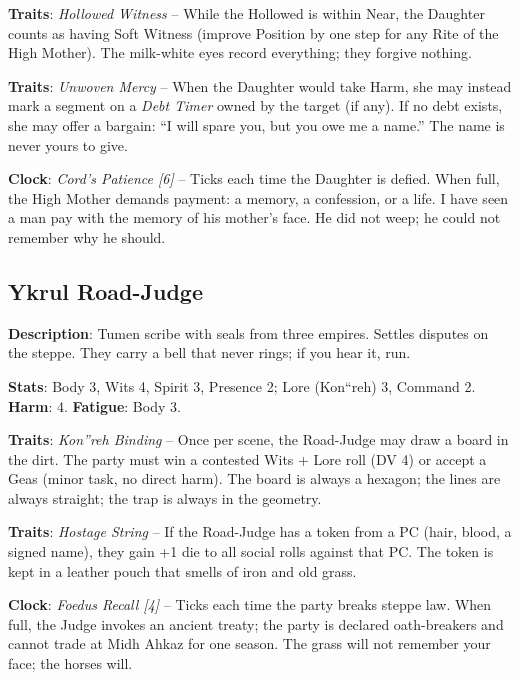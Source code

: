 \noindent\textbf{Traits}: \emph{Hollowed Witness} -- While the Hollowed is within Near, the Daughter counts as having Soft Witness (improve Position by one step for any Rite of the High Mother). The milk-white eyes record everything; they forgive nothing.

\noindent\textbf{Traits}: \emph{Unwoven Mercy} -- When the Daughter would take Harm, she may instead mark a segment on a \emph{Debt Timer } owned by the target (if any). If no debt exists, she may offer a bargain: ``I will spare you, but you owe me a name.'' The name is never yours to give.

\noindent\textbf{Clock}: \emph{Cord's Patience [6]} -- Ticks each time the Daughter is defied. When full, the High Mother demands payment: a memory, a confession, or a life. I have seen a man pay with the memory of his mother's face. He did not weep; he could not remember why he should.


\subsection*{Ykrul Road-Judge}

\noindent\textbf{Description}: Tumen scribe with seals from three empires. Settles disputes on the steppe. They carry a bell that never rings; if you hear it, run.

\noindent\textbf{Stats}: Body 3, Wits 4, Spirit 3, Presence 2; Lore (Kon``reh) 3, Command 2.\\
\textbf{Harm}: 4. \textbf{Fatigue}: Body 3.

\noindent\textbf{Traits}: \emph{Kon''reh Binding} -- Once per scene, the Road-Judge may draw a board in the dirt. The party must win a contested Wits + Lore roll (DV 4) or accept a Geas (minor task, no direct harm). The board is always a hexagon; the lines are always straight; the trap is always in the geometry.

\noindent\textbf{Traits}: \emph{Hostage String} -- If the Road-Judge has a token from a PC (hair, blood, a signed name), they gain +1 die to all social rolls against that PC. The token is kept in a leather pouch that smells of iron and old grass.

\noindent\textbf{Clock}: \emph{Foedus Recall [4]} -- Ticks each time the party breaks steppe law. When full, the Judge invokes an ancient treaty; the party is declared oath-breakers and cannot trade at Midh Ahkaz for one season. The grass will not remember your face; the horses will.

